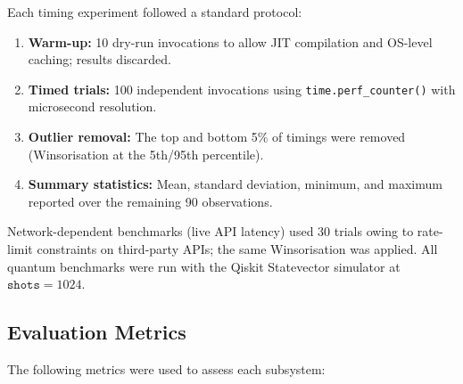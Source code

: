 \documentclass[12pt,a4paper]{article}
\begin{document}
Each timing experiment followed a standard protocol:

\begin{enumerate}[leftmargin=*]
\item \textbf{Warm-up:} 10 dry-run invocations to allow JIT compilation and
      OS-level caching; results discarded.
\item \textbf{Timed trials:} 100 independent invocations using
      \texttt{time.perf\_counter()} with microsecond resolution.
\item \textbf{Outlier removal:} The top and bottom 5\% of timings were
      removed (Winsorisation at the 5th/95th percentile).
\item \textbf{Summary statistics:} Mean, standard deviation, minimum, and
      maximum reported over the remaining 90 observations.
\end{enumerate}

Network-dependent benchmarks (live API latency) used 30 trials owing to
rate-limit constraints on third-party APIs; the same Winsorisation was applied.
All quantum benchmarks were run with the Qiskit Statevector simulator at
$\texttt{shots} = 1024$.

\subsection{Evaluation Metrics}
\label{sec:expsetup:metrics}

The following metrics were used to assess each subsystem:
\end{document}

